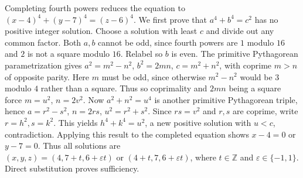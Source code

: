 Completing fourth powers reduces the equation to $(x-4)^4+(y-7)^4=(z-6)^4$. We first prove that $a^4+b^4=c^2$ has no positive integer solution. Choose a solution with least $c$ and divide out any common factor. Both $a,b$ cannot be odd, since fourth powers are $1$ modulo $16$ and $2$ is not a square modulo $16$. Relabel so $b$ is even. The primitive Pythagorean parametrization gives $a^2=m^2-n^2$, $b^2=2mn$, $c=m^2+n^2$, with coprime $m>n$ of opposite parity. Here $m$ must be odd, since otherwise $m^2-n^2$ would be $3$ modulo $4$ rather than a square. Thus so coprimality and $2mn$ being a square force $m=u^2$, $n=2v^2$. Now $a^2+n^2=u^4$ is another primitive Pythagorean triple, hence $a=r^2-s^2$, $n=2rs$, $u^2=r^2+s^2$. Since $rs=v^2$ and $r,s$ are coprime, write $r=h^2,s=k^2$. This yields $h^4+k^4=u^2$, a new positive solution with $u<c$, contradiction. Applying this result to the completed equation shows $x-4=0$ or $y-7=0$. Thus all solutions are $\boxed{(x,y,z)=(4,7+t,6+\varepsilon t)\text{ or }(4+t,7,6+\varepsilon t)}$, where $t\in\mathbb Z$ and $\varepsilon\in\{-1,1\}$. Direct substitution proves sufficiency.
